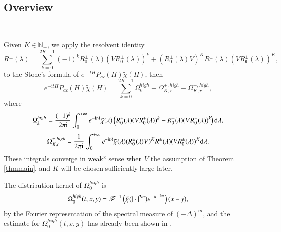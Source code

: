 \documentclass[11pt,reqno]{amsart}
\def\d{{\rm d}}
\def\i{{\rm i}}
\numberwithin{equation}{section}
\theoremstyle{definition}
\begin{document}
\subsection{Overview}\

Given $K\in\mathbb{N}_+$, we apply the resolvent identity
\begin{equation*}
	R^\pm(\lambda)=\sum_{k=0}^{2K-1}(-1)^kR_0^\pm(\lambda)(VR_0^\pm(\lambda))^k+(R_0^\pm(\lambda) V)^KR^\pm(\lambda)(VR_0^\pm(\lambda))^K,
\end{equation*}
to the Stone's formula of $e^{-\mathrm{i}tH}P_{ac}(H)\tilde{\chi}(H)$, then
\begin{equation*}
	e^{-\mathrm{i}tH}P_{ac}(H)\tilde{\chi}(H)=\sum_{k=0}^{2K-1}\Omega_k^{high}+\Omega_{K,r}^{+,high}-\Omega_{K,r}^{-,high},
\end{equation*}
where
\begin{equation*}\label{Omegak}
	\Omega_k^{high}=\frac{(-1)^k}{2\pi\i}\int_0^{+\infty}e^{-\mathrm{i}t\lambda}\tilde{\chi}(\lambda)\left(R_0^+(\lambda)(VR_0^+(\lambda))^k-R_0^-(\lambda)(VR_0^-(\lambda))^k\right)\d\lambda,
\end{equation*}
\begin{equation}\label{OmegaKr}
	\Omega_{K,r}^{\pm,high}=\frac{1}{2\pi\i}\int_0^{+\infty}e^{-\mathrm{i}t\lambda}\tilde{\chi}(\lambda)(R_0^\pm(\lambda)V)^KR^\pm(\lambda)(VR_0^\pm(\lambda))^K\d\lambda.
\end{equation}
These integrals converge in weak* sense when $V$ the assumption of Theorem \ref{thmmain}, and $K$ will be chosen sufficiently large later.

The distribution kernel of $\Omega_0^{high}$ is
\begin{equation*}
	\Omega_0^{high}(t,x,y)=\mathscr{F}^{-1}\left(\tilde{\chi}(|\cdot|^{2m})e^{-\i t|\cdot|^{2m}}\right)(x-y),
\end{equation*}
by the Fourier representation of the spectral measure of $(-\Delta)^{m}$, and the estimate for $\Omega_0^{high}(t,x,y)$ has already been shown in \cite[Lemma 2.1]{HHZ}.
\end{document}
